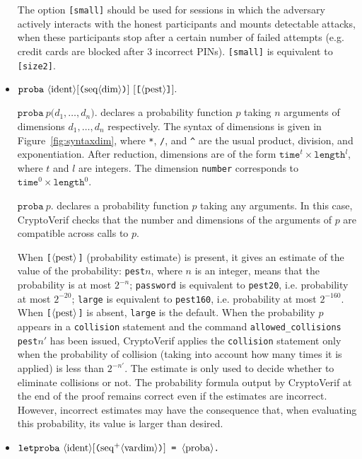 \begin{itemize}
The option \texttt{[small]} should be used for sessions in which the
adversary actively interacts with the honest participants and mounts
detectable attacks, when these participants stop after a certain
number of failed attempts (e.g. credit cards are blocked after 3 incorrect
PINs).
\texttt{[small]} is equivalent to \texttt{[size2]}.

\item $\texttt{proba}\ \nonterm{ident}[\texttt{(}\seq{dim}\texttt{)}]\ [\texttt{[$\nonterm{pest}$]}].$

$\texttt{proba}\ p\texttt{(}d_1, \dots, d_n\texttt{).}$ declares a probability function $p$
taking $n$ arguments of dimensions $d_1, \dots, d_n$ respectively. The syntax of dimensions is given in Figure~\ref{fig:syntaxdim}, where \texttt{*}, \texttt{/}, and \texttt{\^{ }} are the usual product, division, and exponentiation. After reduction, dimensions are of the form $\texttt{time}^t \times \texttt{length}^l$, where $t$ and $l$ are integers. The dimension \texttt{number} corresponds to $\texttt{time}^0 \times \texttt{length}^0$.

$\texttt{proba}\ p\texttt{.}$ declares a probability function $p$ taking any arguments. In this case, CryptoVerif checks that the number and dimensions of the arguments of $p$ are compatible across calls to $p$.

When \texttt{[$\langle\textrm{pest}\rangle$]} ({\sc p}robability {\sc est}imate) is present, 
it gives an estimate of the value of the probability:
\texttt{pest$n$}, where $n$ is an integer, means that the probability is at most $2^{-n}$;
\texttt{password} is equivalent to \texttt{pest20}, i.e. probability at most $2^{-20}$;
\texttt{large} is equivalent to \texttt{pest160}, i.e. probability at most $2^{-160}$.
When \texttt{[$\langle\textrm{pest}\rangle$]} is absent, \texttt{large} is the default.
%
When the probability $p$ appears in a \texttt{collision} statement and
the command \texttt{allowed\_collisions pest$n'$} has been issued,
CryptoVerif applies the \texttt{collision} statement only when the
probability of collision (taking into account how many times it is
applied) is less than $2^{-n'}$.
The estimate is only used to decide whether to eliminate collisions or not.
The probability formula output by CryptoVerif at the end of the proof
remains correct even if the estimates are incorrect. However,
incorrect estimates may have the consequence that, when evaluating
this probability, its value is larger than desired.

\item $\texttt{letproba}\ \nonterm{ident}[\texttt{(}\neseq{vardim}\texttt{)}] \texttt{ = }\nonterm{proba}\texttt{.}$


\end{itemize}
